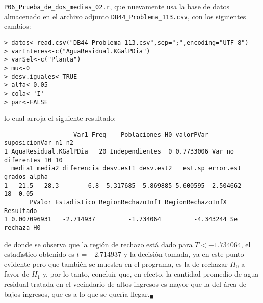 \begin{solucion}
 \texttt{P06\_Prueba\_de\_dos\_medias\_02.r},
 que nuevamente usa la base de datos almacenado en el archivo adjunto
 \texttt{DB44\_Problema\_113.csv}, con los siguientes cambios:
 \begin{verbatim}
> datos<-read.csv("DB44_Problema_113.csv",sep=";",encoding="UTF-8")
> varInteres<-c("AguaResidual.KGalPDia")
> varSel<-c("Planta")
> mu<-0
> desv.iguales<-TRUE
> alfa<-0.05
> cola<-'I'
> par<-FALSE
 \end{verbatim}
 \vspace{-0.5cm}
 lo cual arroja el siguiente resultado:
 \begin{verbatim}
                   Var1 Freq    Poblaciones H0 valorPVar     suposicionVar n1 n2
1 AguaResidual.KGalPDia   20 Independientes  0 0.7733006 Var no diferentes 10 10
  media1 media2 diferencia desv.est1 desv.est2   est.sp error.est grados alpha
1   21.5   28.3       -6.8  5.317685  5.869885 5.600595  2.504662     18  0.05
       PValor Estadistico RegionRechazoInfT RegionRechazoInfX     Resultado
1 0.007096931   -2.714937         -1.734064         -4.343244 Se rechaza H0
 \end{verbatim}
 \vspace{-0.5cm}
 de donde se observa que la regi\'on de rechazo est\'a dado
 para $T < -1.734064$,
 el estad\'{\i}stico obtenido es $t = -2.714937$ y la decisi\'on tomada,
 ya en este punto evidente pero que tambi\'en se muestra en el programa,
 es la de rechazar $H_0$ a favor de $H_1$ y, por lo tanto, concluir
 que, en efecto, la cantidad promedio de agua residual tratada
 en el vecindario de altos ingresos es mayor que la del \'area
 de bajos ingresos, que es a lo que se quer\'{\i}a llegar.${}_{\blacksquare}$
\end{solucion}
